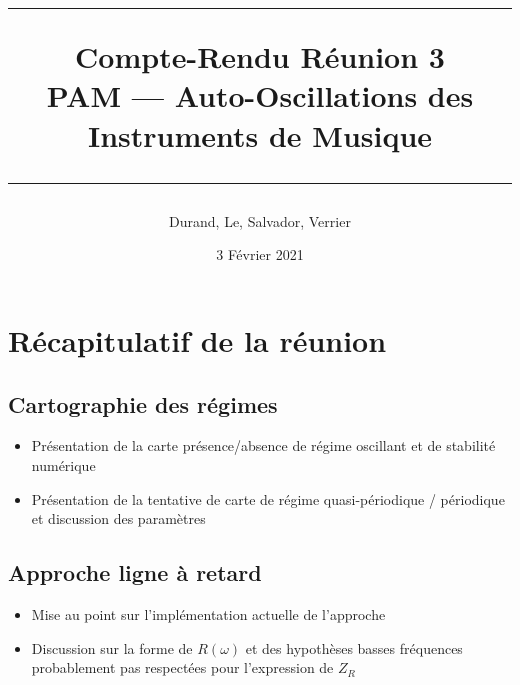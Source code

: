 \documentclass[a4paper, 11pt]{article}
\title{
	\noindent\rule{\linewidth}{0.4pt}
	\huge{Compte-Rendu Réunion 3\\}
	\medskip
	\Large{PAM --- Auto-Oscillations des Instruments de Musique}
	\noindent\rule{\linewidth}{1pt}
}
\author{Durand, Le, Salvador, Verrier}
\date{3 Février 2021}
\begin{document}
\maketitle


\section{Récapitulatif de la réunion}
\subsection{Cartographie des régimes}
\begin{itemize}
	\item Présentation de la carte présence/absence de régime oscillant et de stabilité numérique
	\item Présentation de la tentative de carte de régime quasi-périodique / périodique et discussion des paramètres
\end{itemize}
\subsection{Approche ligne à retard}
\begin{itemize}
	\item Mise au point sur l'implémentation actuelle de l'approche
	\item Discussion sur la forme de $R(\omega)$ et des hypothèses basses fréquences probablement pas respectées pour l'expression de $Z_R$ 
\end{itemize}
\end{document}
